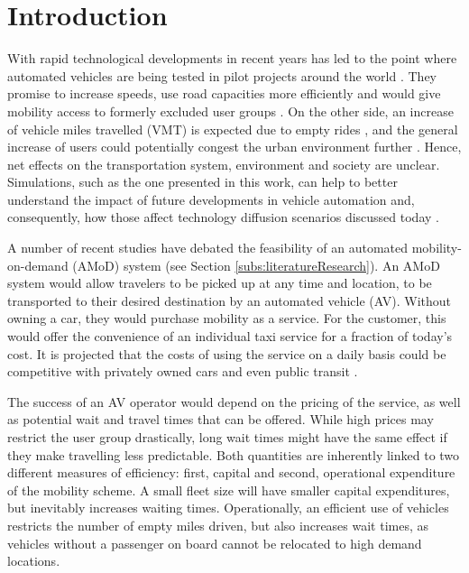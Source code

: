 \section{Introduction}

With rapid technological developments in recent years has led to the point where automated vehicles are being tested in pilot projects around the world \citep{ackerman2017hail}. They promise to increase speeds, use road capacities more efficiently \citep{Tientrakool2011,Friedrich2015} and would give mobility access to formerly excluded user groups \citep{Truong2017}. On the other side, an increase of vehicle miles travelled (VMT) is expected due to empty rides \citep{Litman2014}, and the general increase of users could potentially congest the urban environment further \citep{Meyer2017}. Hence, net effects on the transportation system, environment and society are unclear. Simulations, such as the one presented in this work, can help to better understand the impact of future developments in vehicle automation and, consequently, how those affect technology diffusion scenarios discussed today \citep{NIEUWENHUIJSEN2018300}.

A number of recent studies have debated the feasibility of an automated mobility-on-demand (AMoD) system (see Section  \ref{subs:literatureResearch}). An AMoD system would allow travelers to be picked up at any time and location, to be transported to their desired destination by an automated vehicle (AV). Without owning a car, they would purchase mobility as a service. For the customer, this would offer the convenience of an individual taxi service for a fraction of today's cost. It is projected that the costs of using the service on a daily basis could be competitive with privately owned cars and even
public transit \citep{Bosch2016a}.

The success of an AV operator would depend on the pricing of the service,
as well as potential wait and travel times that can be offered. While high prices
may restrict the user group drastically, long wait times might have the same effect
if they make travelling less predictable. Both quantities are inherently
linked to two different measures of efficiency: first, capital and second, operational expenditure of the mobility scheme. A small fleet size
will have smaller capital expenditures, but inevitably increases waiting times. Operationally, an efficient use of vehicles restricts the number of empty miles driven, but also increases wait times, as vehicles without a passenger on board cannot be relocated to high demand locations.


